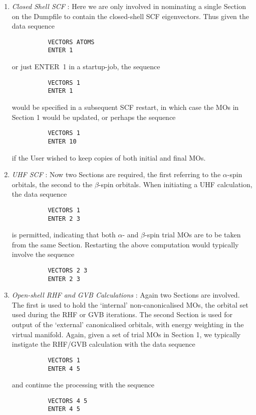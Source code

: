 \documentclass[11pt,fleqn]{article}
\begin{document}
\begin{enumerate}
\item {\em Closed Shell SCF} :  Here we are only involved in nominating
a single Section on the Dumpfile to contain the closed-shell SCF
eigenvectors. Thus given the data sequence

{
\footnotesize
\begin{verbatim}
          VECTORS ATOMS
          ENTER 1
\end{verbatim}
}
or just ENTER~1 in a startup-job, the sequence

{
\footnotesize
\begin{verbatim}
          VECTORS 1
          ENTER 1
\end{verbatim}
}
would be specified in a subsequent SCF restart, in which case
the MOs in Section 1 would be updated, or perhaps the sequence

{
\footnotesize
\begin{verbatim}
          VECTORS 1
          ENTER 10
\end{verbatim}
}
if the User wished to keep copies of both initial and final MOs.

\item {\em UHF SCF} : Now two Sections are required, the first referring
to the $\alpha$-spin orbitals, the second to the $\beta$-spin
orbitals. When initiating a UHF calculation, the data sequence

{
\footnotesize
\begin{verbatim}
          VECTORS 1
          ENTER 2 3
\end{verbatim}
}
is permitted, indicating that both $\alpha$- and $\beta$-spin trial MOs are to
be taken from the same Section. Restarting the above computation
would typically involve the sequence

{
\footnotesize
\begin{verbatim}
          VECTORS 2 3
          ENTER 2 3
\end{verbatim}
}

\item {\em Open-shell RHF and GVB Calculations}  : Again two Sections are
involved. The first is used to hold the `internal' non-canonicalised
MOs, the orbital set used during the RHF or GVB iterations. The second
Section is used for output of the `external' canonicalised orbitals,
with energy weighting in the virtual manifold.
Again, given a set of trial MOs in Section 1, we typically instigate
the RHF/GVB calculation with the data sequence

{
\footnotesize
\begin{verbatim}
          VECTORS 1
          ENTER 4 5
\end{verbatim}
}
and continue the processing with the sequence
{
\footnotesize
\begin{verbatim}
          VECTORS 4 5
          ENTER 4 5
\end{verbatim}
}


\end{enumerate}
\end{document}
